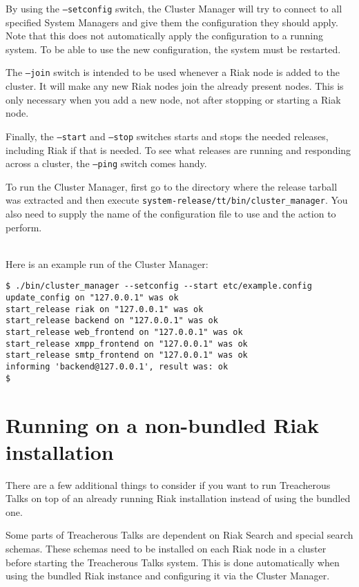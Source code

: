 \documentclass[11pt,a4paper]{report}
\begin{document}
By using the {\tt --setconfig} switch, the Cluster Manager will try to connect
to all specified System Managers and give them the configuration they should
apply. Note that this does not automatically apply the configuration to a
running system. To be able to use the new configuration, the system must be
restarted.

The {\tt --join} switch is intended to be used whenever a Riak node is added to
the cluster. It will make any new Riak nodes join the already present
nodes. This is only necessary when you add a new node, not after stopping or
starting a Riak node.

Finally, the {\tt --start} and {\tt --stop} switches starts and stops the needed
releases, including Riak if that is needed. To see what releases are running and
responding across a cluster, the {\tt--ping} switch comes handy.

\begin{sloppypar}
To run the Cluster Manager, first go to the directory where the release tarball
was extracted and then execute {\tt system-release/tt/bin/cluster\_manager}. You
also need to supply the name of the configuration file to use and the action to
perform.
\end{sloppypar}
\mbox{}\\
Here is an example run of the Cluster Manager:
\begin{verbatim}
$ ./bin/cluster_manager --setconfig --start etc/example.config
update_config on "127.0.0.1" was ok
start_release riak on "127.0.0.1" was ok
start_release backend on "127.0.0.1" was ok
start_release web_frontend on "127.0.0.1" was ok
start_release xmpp_frontend on "127.0.0.1" was ok
start_release smtp_frontend on "127.0.0.1" was ok
informing 'backend@127.0.0.1', result was: ok
$
\end{verbatim}
\section{Running on a non-bundled Riak installation}
There are a few additional things to consider if you want to run Treacherous
Talks on top of an already running Riak installation instead of using the
bundled one.

Some parts of Treacherous Talks are dependent on Riak Search and special search
schemas. These schemas need to be installed on each Riak node in a cluster
before starting the Treacherous Talks system. This is done automatically when
using the bundled Riak instance and configuring it via the Cluster Manager.
\end{document}
